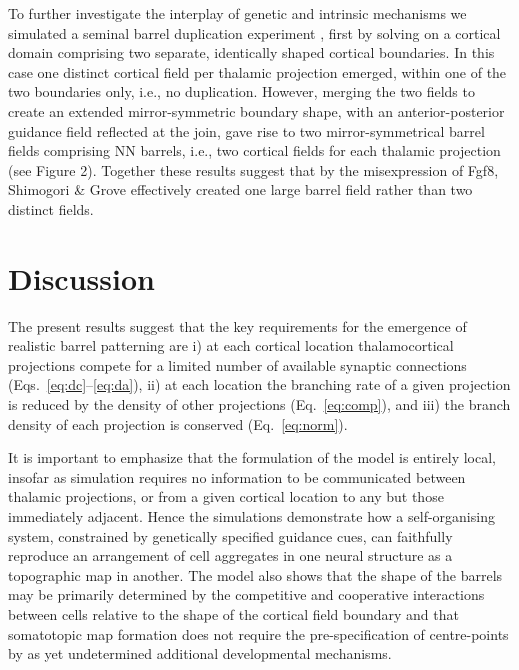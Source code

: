 \documentclass[9pt,twocolumn,twoside,lineno]{pnas-new}
\begin{document}
To further investigate the interplay of genetic and intrinsic mechanisms we simulated a seminal barrel duplication experiment \cite{shimogori_fibroblast_2005},  first by solving on a cortical domain comprising two separate, identically shaped cortical boundaries. In this case one distinct cortical field per thalamic projection emerged, within one of the two boundaries only, i.e., no duplication. However, merging the two fields to create an extended mirror-symmetric boundary shape, with an anterior-posterior guidance field reflected at the join, gave rise to two mirror-symmetrical barrel fields comprising NN barrels, i.e., two cortical fields for each thalamic projection (see Figure 2). Together these results suggest that by the misexpression of Fgf8, Shimogori \& Grove \citep{shimogori_fibroblast_2005} effectively created one large barrel field rather than two distinct fields.

\section*{Discussion}

The present results suggest that the key requirements for the emergence of realistic barrel patterning are i) at each cortical location thalamocortical projections compete for a limited number of available synaptic connections (Eqs.~\ref{eq:dc}--\ref{eq:da}), ii) at each location the branching rate of a given projection is reduced by the density of other projections (Eq.~\ref{eq:comp}), and iii) the branch density of each projection is conserved (Eq.~\ref{eq:norm}).

It is important to emphasize that the formulation of the model is entirely local, insofar as simulation requires no information to be communicated between thalamic projections, or from a given cortical location to any but those immediately adjacent. Hence the simulations demonstrate how a self-organising system, constrained by genetically specified guidance cues, can faithfully reproduce an arrangement of cell aggregates in one neural structure as a topographic map in another.
%
The model also shows that the shape of the barrels may be primarily determined
by the competitive and cooperative interactions between cells relative to the
shape of the cortical field boundary and that somatotopic map formation does
not require the pre-specification of centre-points by as yet undetermined
additional developmental mechanisms.


\end{document}
